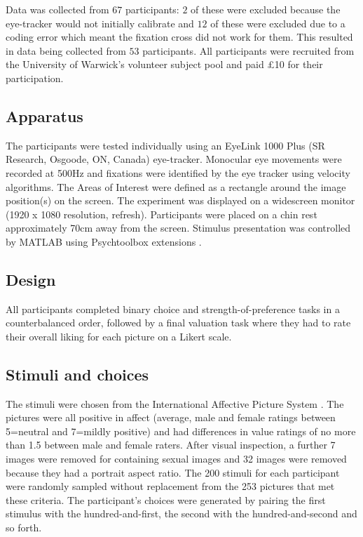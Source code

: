 \documentclass[12pt]{article}
\begin{document}
Data was collected from $67$ participants: $2$ of these were excluded because the eye-tracker would not initially calibrate and $12$ of these were excluded due to a coding error which meant the fixation cross did not work for them. This resulted in data being collected from $53$ participants. All participants were recruited from the University of Warwick’s volunteer subject pool and paid £10 for their participation.

\subsection{Apparatus}
The participants were tested individually using an EyeLink 1000 Plus (SR Research, Osgoode, ON, Canada) eye-tracker. Monocular eye movements were recorded at 500Hz and fixations were identified by the eye tracker using velocity algorithms. The Areas of Interest were defined as a rectangle around the image position(s) on the screen. The experiment was displayed on a widescreen monitor (1920 x 1080 resolution, refresh). Participants were placed on a chin rest approximately 70cm away from the screen. Stimulus presentation was controlled by MATLAB using Psychtoolbox extensions \cite{Brainard1997, Pelli1997}.

\subsection{Design}
All participants completed binary choice and strength-of-preference tasks in a counterbalanced order, followed by a final valuation task where they had to rate their overall liking for each picture on a Likert scale. 

\subsection{Stimuli and choices}
The stimuli were chosen from the International Affective Picture System \cite{Lang:2008}. The pictures were all positive in affect (average, male and female ratings between 5=neutral and 7=mildly positive) and had differences in value ratings of no more than 1.5 between male and female raters. After visual inspection, a further 7 images were removed for containing sexual images and 32 images were removed because they had a portrait aspect ratio. The 200 stimuli for each participant were randomly sampled without replacement from the 253 pictures that met these criteria. The participant's choices were generated by pairing the first stimulus with the hundred-and-first, the second with the hundred-and-second and so forth. 
\end{document}
